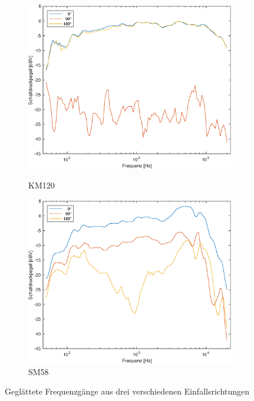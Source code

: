 \begin{figure}[bth]
    \centering
    \begin{subfigure}{.5\textwidth}
        \centering
        \caption{KM120}
        \includegraphics[width=0.95\linewidth]{Figures/km120_all}
        \label{fig:km_sm}
    \end{subfigure}%
    \begin{subfigure}{.5\textwidth}
        \centering
        \caption{SM58}
        \includegraphics[width=0.95\linewidth]{Figures/sm58_all.eps}
    \end{subfigure}
    \caption{Geglättete Frequenzgänge aus drei verschiedenen Einfallsrichtungen}
    \label{fig:freq_all}
\end{figure}

